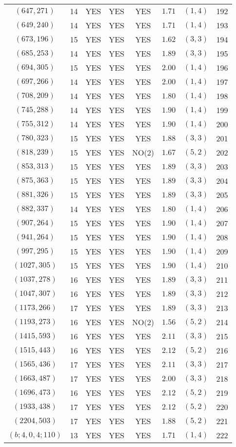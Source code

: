 \begin{longtable}{|c|c|c|c|c|c|c|c|}
$(647,271)$ & 14 & YES & YES & YES & $1.71$ & $(1,4)$ & 192\\
$(649,240)$ & 14 & YES & YES & YES & $1.71$ & $(1,4)$ & 193\\
$(673,196)$ & 15 & YES & YES & YES & $1.62$ & $(3,3)$ & 194\\
$(685,253)$ & 14 & YES & YES & YES & $1.89$ & $(3,3)$ & 195\\
$(694,305)$ & 15 & YES & YES & YES & $2.00$ & $(1,4)$ & 196\\
$(697,266)$ & 14 & YES & YES & YES & $2.00$ & $(1,4)$ & 197\\
$(708,209)$ & 14 & YES & YES & YES & $1.80$ & $(1,4)$ & 198\\
$(745,288)$ & 14 & YES & YES & YES & $1.90$ & $(1,4)$ & 199\\
$(755,312)$ & 14 & YES & YES & YES & $1.90$ & $(1,4)$ & 200\\
$(780,323)$ & 15 & YES & YES & YES & $1.88$ & $(3,3)$ & 201\\
$(818,239)$ & 15 & YES & YES & NO(2) & $1.67$ & $(5,2)$ & 202\\
$(853,313)$ & 15 & YES & YES & YES & $1.89$ & $(3,3)$ & 203\\
$(875,363)$ & 15 & YES & YES & YES & $1.89$ & $(3,3)$ & 204\\
$(881,326)$ & 15 & YES & YES & YES & $1.89$ & $(3,3)$ & 205\\
$(882,337)$ & 14 & YES & YES & YES & $1.80$ & $(1,4)$ & 206\\
$(907,264)$ & 15 & YES & YES & YES & $1.90$ & $(1,4)$ & 207\\
$(941,264)$ & 15 & YES & YES & YES & $1.90$ & $(1,4)$ & 208\\
$(997,295)$ & 15 & YES & YES & YES & $1.90$ & $(1,4)$ & 209\\
$(1027,305)$ & 15 & YES & YES & YES & $1.90$ & $(1,4)$ & 210\\
$(1037,278)$ & 16 & YES & YES & YES & $1.89$ & $(3,3)$ & 211\\
$(1047,307)$ & 16 & YES & YES & YES & $1.89$ & $(3,3)$ & 212\\
$(1173,266)$ & 17 & YES & YES & YES & $1.89$ & $(3,3)$ & 213\\
$(1193,273)$ & 16 & YES & YES & NO(2) & $1.56$ & $(5,2)$ & 214\\
$(1415,593)$ & 16 & YES & YES & YES & $2.11$ & $(3,3)$ & 215\\
$(1515,443)$ & 16 & YES & YES & YES & $2.12$ & $(5,2)$ & 216\\
$(1565,436)$ & 17 & YES & YES & YES & $2.11$ & $(3,3)$ & 217\\
$(1663,487)$ & 17 & YES & YES & YES & $2.00$ & $(3,3)$ & 218\\
$(1696,473)$ & 16 & YES & YES & YES & $2.12$ & $(5,2)$ & 219\\
$(1933,438)$ & 17 & YES & YES & YES & $2.12$ & $(5,2)$ & 220\\
$(2204,503)$ & 17 & YES & YES & YES & $1.88$ & $(5,2)$ & 221\\
$(b;4,0,4;110)$ & 13 & YES & YES & YES & $1.71$ & $(1,4)$ & 222
\end{longtable}
